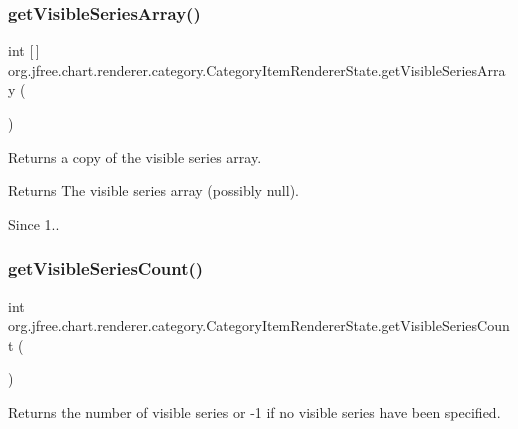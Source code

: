 \subsubsection{\texorpdfstring{get\+Visible\+Series\+Array()}{getVisibleSeriesArray()}}
{\footnotesize\ttfamily int \mbox{[}$\,$\mbox{]} org.\+jfree.\+chart.\+renderer.\+category.\+Category\+Item\+Renderer\+State.\+get\+Visible\+Series\+Array (\begin{DoxyParamCaption}{ }\end{DoxyParamCaption})}

Returns a copy of the visible series array.

\begin{DoxyReturn}{Returns}
The visible series array (possibly {\ttfamily null}).
\end{DoxyReturn}
\begin{DoxySince}{Since}
1.. 
\end{DoxySince}
\mbox{\label{classorg_1_1jfree_1_1chart_1_1renderer_1_1category_1_1_category_item_renderer_state_a7816c579db80e7d8e40b94ddaa2e593d}} 
\subsubsection{\texorpdfstring{get\+Visible\+Series\+Count()}{getVisibleSeriesCount()}}
{\footnotesize\ttfamily int org.\+jfree.\+chart.\+renderer.\+category.\+Category\+Item\+Renderer\+State.\+get\+Visible\+Series\+Count (\begin{DoxyParamCaption}{ }\end{DoxyParamCaption})}

Returns the number of visible series or -\/1 if no visible series have been specified.

